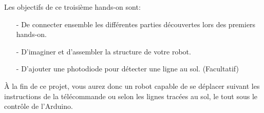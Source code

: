 Les objectifs de ce troisième hands-on sont:
\begin{itemize}
	\item[-] De connecter ensemble les différentes parties découvertes lors des premiers hands-on.
	\item[-] D'imaginer et d'assembler la structure de votre robot.
	\item[-] D'ajouter une photodiode pour détecter une ligne au sol. (Facultatif)
\end{itemize}

À la fin de ce projet, vous aurez donc un robot capable de se déplacer suivant les instructions de la télécommande ou selon les lignes tracées au sol, le tout sous le contrôle de l'Arduino.
